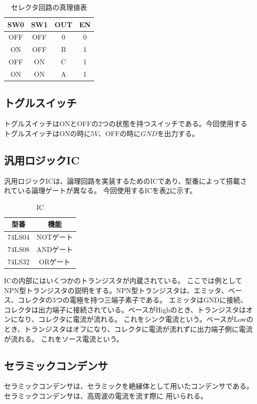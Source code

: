 \documentclass[a4paper,11pt,dvipdfmx]{jsarticle}
\begin{document}
\begin{table}[H]
\centering
\caption{セレクタ回路の真理値表}
\label{tab:selector}
\begin{tabular}{|cc|cc|}
  \hline
  SW0 & SW1 & OUT & EN\\
  \hline
  OFF & OFF & 0 & 0\\
  ON  & OFF & B & 1\\
  OFF & ON  & C & 1\\
  ON  & ON  & A & 1\\
  \hline
\end{tabular}
\end{table}

\subsection{トグルスイッチ}
トグルスイッチはONとOFFの2つの状態を持つスイッチである。今回使用するトグルスイッチはONの時に$5V$、OFFの時に$GND$を出力する。

\subsection{汎用ロジックIC}
汎用ロジックICは、論理回路を実装するためのICであり、型番によって搭載されている論理ゲートが異なる。
今回使用するICを表\ref{tab:IC}に示す。
\begin{table}[H]
  \centering
  \caption{IC}
  \begin{tabular}{|c|c|}
    \hline
    型番  &  機能  \\
    \hline
    74LS04 & NOTゲート \\
    74LS08 & ANDゲート \\
    74LS32 & ORゲート \\
    \hline
  \end{tabular}
  \label{tab:IC}
\end{table}
ICの内部にはいくつかのトランジスタが内蔵されている。
ここでは例としてNPN型トランジスタの説明をする。NPN型トランジスタは、エミッタ、ベース、コレクタの3つの電極を持つ三端子素子である。
エミッタはGNDに接続、コレクタは出力端子に接続されている。ベースがHighのとき、トランジスタはオンになり、コレクタに電流が流れる。
これをシンク電流という。ベースがLowのとき、トランジスタはオフになり、コレクタに電流が流れずに出力端子側に電流が流れる。
これをソース電流という。

\subsection{セラミックコンデンサ}
セラミックコンデンサは、セラミックを絶縁体として用いたコンデンサである。セラミックコンデンサは、高周波の電流を流す際に
用いられる。
\end{document}

